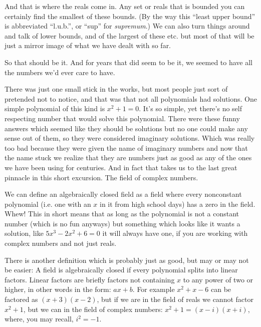 And that is where the reals come in. Any set or reals that is bounded
you can certainly find the smallest of these bounds. (By the way this
``least upper bound'' is abbreviated ``l.u.b.'', or ``sup'' for {\it
  supremum}.) We can also turn things around and talk of lower bounds,
and of the largest of these etc. but most of that will be just a mirror
image of what we have dealt with so far.

So that should be it. And for years that did seem to be it, we seemed to
have all the numbers we'd ever care to have.

There was just one small stick in the works, but most people just sort
of pretended not to notice, and that was that not all polynomials had
solutions. One simple polynomial of this kind is $x^2 + 1 = 0$.  It's so
simple, yet there's no self respecting number that would solve this
polynomial. There were these funny answers which seemed like they should
be solutions but no one could make any sense out of them, so they were
considered imaginary solutions.  Which was really too bad because they
were given the name of imaginary numbers and now that the name stuck we
realize that they are numbers just as good as any of the ones we have
been using for centuries. And in fact that takes us to the last great
pinnacle in this short excursion. The field of complex numbers.

We can define an algebraically closed field as a field where every
nonconstant polynomial (i.e. one with an $x$ in it from high school
days) has a zero in the field. Whew! This in short means that as long as
the polynomial is not a constant number (which is no fun anyways) but
something which looks like it wants a solution, like $5 x^3 - 2 x^2 + 6
= 0$ it will always have one, if you are working with complex numbers
and not just reals.


There is another definition which is probably just as good, but may or
may not be easier: A field is algebraically closed if every polynomial
splits into linear factors.  Linear factors are briefly factors not
containing $x$ to any power of two or higher, in other words in the
form: $ax + b$. For example $x^2 + x -6$ can be factored as $(x + 3)(x -
2)$, but if we are in the field of reals we cannot factor $x^2 + 1$, but
we can in the field of complex numbers: $x^2 + 1 = (x - i)(x + i)$,
where, you may recall, $i^2 = -1$.
